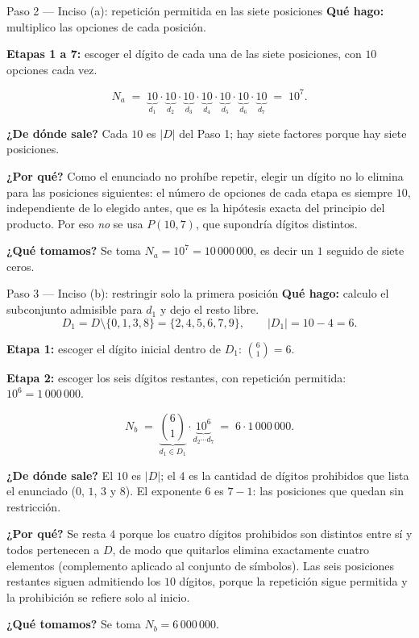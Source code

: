 \documentclass[11pt]{article}
\begin{document}
\begin{paso}{Paso 2 --- Inciso (a): repetición permitida en las siete posiciones}
\textbf{Qué hago:} multiplico las opciones de cada posición.

\medskip
\textbf{Etapas 1 a 7:} escoger el dígito de cada una de las siete posiciones, con $10$ opciones cada vez.

\medskip
\[
  N_a \;=\; \underbrace{10}_{d_1}\cdot \underbrace{10}_{d_2}\cdot \underbrace{10}_{d_3}\cdot \underbrace{10}_{d_4}\cdot \underbrace{10}_{d_5}\cdot \underbrace{10}_{d_6}\cdot \underbrace{10}_{d_7} \;=\; 10^7 .
\]

\textbf{¿De dónde sale?} Cada $10$ es $|D|$ del Paso 1; hay siete factores porque hay siete posiciones.

\textbf{¿Por qué?} Como el enunciado no prohíbe repetir, elegir un dígito no lo elimina para las posiciones siguientes: el número de opciones de cada etapa es siempre $10$, independiente de lo elegido antes, que es la hipótesis exacta del principio del producto. Por eso \emph{no} se usa $P(10,7)$, que supondría dígitos distintos.

\textbf{¿Qué tomamos?} Se toma $N_a = 10^7 = 10\,000\,000$, es decir un $1$ seguido de siete ceros.
\end{paso}

\begin{paso}{Paso 3 --- Inciso (b): restringir solo la primera posición}
\textbf{Qué hago:} calculo el subconjunto admisible para $d_1$ y dejo el resto libre.
\[
  D_1 = D\setminus\{0,1,3,8\} = \{2,4,5,6,7,9\},\qquad |D_1| = 10-4 = 6 .
\]

\medskip
\textbf{Etapa 1:} escoger el dígito inicial dentro de $D_1$: $\displaystyle\binom{6}{1}=6$.

\textbf{Etapa 2:} escoger los seis dígitos restantes, con repetición permitida: $10^6 = 1\,000\,000$.

\medskip
\[
  N_b \;=\; \underbrace{\binom{6}{1}}_{d_1\in D_1}\cdot \underbrace{10^6}_{d_2\cdots d_7} \;=\; 6\cdot 1\,000\,000 .
\]

\textbf{¿De dónde sale?} El $10$ es $|D|$; el $4$ es la cantidad de dígitos prohibidos que lista el enunciado ($0$, $1$, $3$ y $8$). El exponente $6$ es $7-1$: las posiciones que quedan sin restricción.

\textbf{¿Por qué?} Se resta $4$ porque los cuatro dígitos prohibidos son distintos entre sí y todos pertenecen a $D$, de modo que quitarlos elimina exactamente cuatro elementos (complemento aplicado al conjunto de símbolos). Las seis posiciones restantes siguen admitiendo los $10$ dígitos, porque la repetición sigue permitida y la prohibición se refiere solo al inicio.

\textbf{¿Qué tomamos?} Se toma $N_b = 6\,000\,000$.
\end{paso}
\end{document}
